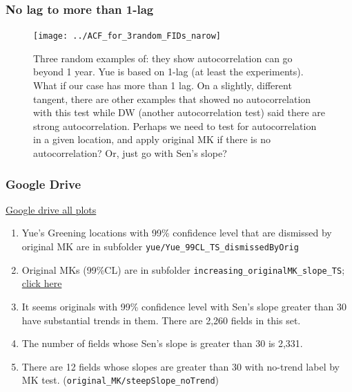 \documentclass[serif, xcolor={dvipsnames}]{beamer} %
\def\code#1{{\scriptsize\texttt{#1}}}
\begin{document}
\begin{frame}
\frametitle{No lag to more than 1-lag}

\begin{figure}[H]
\centering
\texttt{[image: ../ACF\_for\_3random\_FIDs\_narow]}
\captionsetup{singlelinecheck=false} 
\caption*{Three random examples of: they show autocorrelation can go beyond 1 year. 
Yue is based on 1-lag (at least the experiments). What if our case has more than 1 lag.
On a slightly, different tangent, there are other examples that showed 
no autocorrelation with this test 
while DW (another autocorrelation test) said there are strong autocorrelation.
Perhaps we need to test for autocorrelation in a given location,
and apply original MK if there is no autocorrelation? Or, just go with Sen's slope?}
\label{fig:ACF_for_3random_FIDs_narow}
\end{figure}
\end{frame}
\begin{frame}[t]
\frametitle{Google Drive}
\href{https://tinyurl.com/5n76ppzs}{Google drive all plots}

\begin{enumerate}
\item Yue's Greening locations with 99\% confidence level that are dismissed by original MK
are in subfolder \code{yue/Yue\_99CL\_TS\_dismissedByOrig} 

\item Original MKs (99\%CL) are in
subfolder \code{increasing\_originalMK\_slope\_TS}; \href{https://drive.google.com/drive/folders/197H1-FCRkS0gAqGr1DDreCU5n4NMWCwG?usp=share_link}{click here}

\item It seems originals with 99\% confidence level with Sen's slope greater than
30 have substantial trends in them. There are 2,260 fields in this set.

\item The number of fields whose Sen's slope is greater than 30 is 2,331.\\

\item There are 12 fields whose slopes are greater than 30 with no-trend label by MK test. (\code{original\_MK/steepSlope\_noTrend})


\end{enumerate}

\end{frame}
\end{document}

